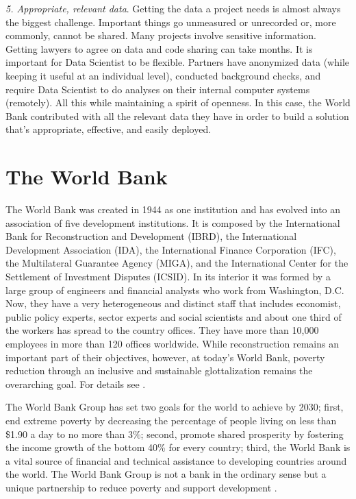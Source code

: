 \textit{5. Appropriate, relevant data}. Getting the data a project  needs is almost always the biggest challenge. Important things go unmeasured or unrecorded or, more commonly, cannot be shared. Many projects involve  sensitive information. Getting lawyers to agree on data and code sharing can take months. It is important for Data Scientist to be flexible. Partners have anonymized data (while keeping it useful at an individual level), conducted background checks, and require Data Scientist to do analyses on their internal computer systems (remotely). All this while maintaining a spirit of openness.  In this case, the World Bank contributed with all the relevant data they have in order to build a solution that's appropriate, effective, and easily deployed.

\section{The World Bank}\label{sec_intro_wb}

The World Bank was created in 1944 as one institution and has evolved into an association of five development institutions. It is composed by  the International Bank for Reconstruction and Development (IBRD), the International Development Association (IDA), the International Finance Corporation (IFC), the Multilateral Guarantee Agency (MIGA), and the International Center for the Settlement of Investment Disputes (ICSID). In its interior it was formed by a large group of engineers and financial analysts who work from Washington, D.C. Now, they have a very heterogeneous and distinct staff that includes economist, public policy experts, sector experts and social scientists and about one third of the workers has spread to the country offices. They have more than 10,000 employees in more than 120 offices worldwide. While reconstruction remains an important part of their objectives, however, at today's World Bank, poverty reduction through an inclusive and sustainable glottalization remains the overarching goal. For details see \parencite{wb_history}. 

The World Bank Group has set two goals for the world to achieve by 2030; first, end extreme poverty by decreasing the percentage of people living on less than \$1.90 a day to no more than 3\%; second, promote shared prosperity by fostering the income growth of the bottom 40\% for every country; third, the World Bank is a vital source of financial and technical assistance to developing countries around the world. The World Bank Group is not a bank in the ordinary sense but a unique partnership to reduce poverty and support development \parencite{wb_about}.

